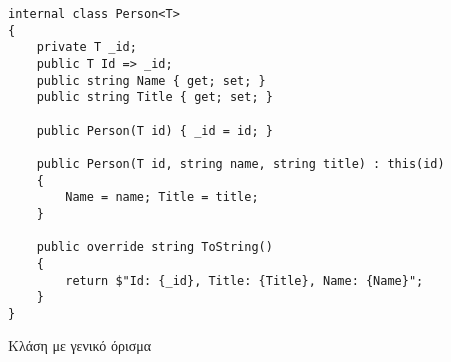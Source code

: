 \begin{listing}[H]
\begin{verbatim}
internal class Person<T>
{
    private T _id;
    public T Id => _id;
    public string Name { get; set; }
    public string Title { get; set; }

    public Person(T id) { _id = id; }
    
    public Person(T id, string name, string title) : this(id)
    {
        Name = name; Title = title;
    }

    public override string ToString()
    {
        return $"Id: {_id}, Title: {Title}, Name: {Name}";
    }
}
\end{verbatim}
\caption{Κλάση με γενικό όρισμα}
\label{genericsPersonClass}
\end{listing}